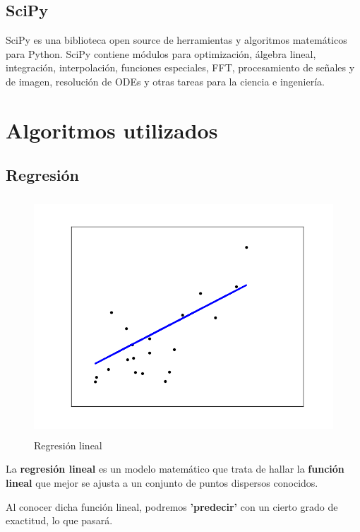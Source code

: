 	\subsection{SciPy}
	SciPy es una biblioteca open source de herramientas y algoritmos matemáticos para Python. SciPy contiene módulos para optimización, álgebra lineal, integración, interpolación, funciones especiales, FFT, procesamiento de señales y de imagen, resolución de ODEs y otras tareas para la ciencia e ingeniería.
	
\section{Algoritmos utilizados}
\label{makereference3.3}
	\subsection{Regresión}
	
	\begin{figure}[htb]
		
		\begin{center}
			\includegraphics[height=3.5in]{figures/regression.png}
			\caption{Regresión lineal}
		\end{center}
		
		\label{regression}
	\end{figure}

	La \textbf{regresión lineal} es un modelo matemático que trata de hallar la \textbf{función lineal} que mejor se ajusta a un conjunto de puntos dispersos conocidos.
	
	Al conocer dicha función lineal, podremos \textbf{'predecir'} con un cierto grado de exactitud, lo que pasará.
	
